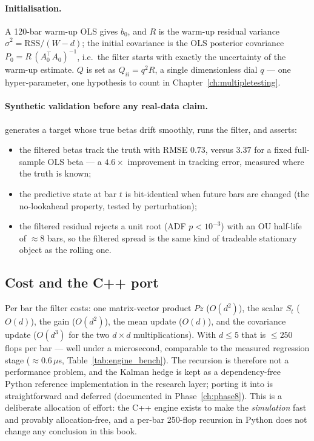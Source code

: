 \paragraph{Initialisation.} A 120-bar warm-up OLS gives $b_0$, and $R$ is the warm-up
residual variance $\hat\sigma^2=\mathrm{RSS}/(W-d)$; the initial covariance is the OLS
posterior covariance $P_0 = R\,(A_0^{\top}A_0)^{-1}$, i.e.\ the filter starts with
exactly the uncertainty of the warm-up estimate. $Q$ is set as $Q_{ii}=q^2R$, a single
dimensionless dial $q$ --- one hyper-parameter, one hypothesis to count in
Chapter~\ref{ch:multipletesting}.

\paragraph{Synthetic validation before any real-data claim.} 
generates a target whose true betas drift smoothly, runs the filter, and asserts:
\begin{itemize}
  \item the filtered betas track the truth with RMSE $0.73$, versus $3.37$ for a fixed
    full-sample OLS beta --- a $4.6\times$ improvement in tracking error, measured where
    the truth is known;
  \item the predictive state at bar $t$ is bit-identical when future bars are changed
    (the no-lookahead property, tested by perturbation);
  \item the filtered residual rejects a unit root (ADF $p<10^{-3}$) with an OU half-life
    of $\approx8$ bars, so the filtered spread is the same kind of tradeable stationary
    object as the rolling one.
\end{itemize}

\subsection{Cost and the C++ port}
\label{sec:kalman:cost}

Per bar the filter costs: one matrix-vector product $Pz$ ($O(d^2)$), the scalar $S_t$
($O(d)$), the gain ($O(d^2)$), the mean update ($O(d)$), and the covariance update
($O(d^3)$ for the two $d\times d$ multiplications). With $d\le5$ that is $\le 250$ flops
per bar --- well under a microsecond, comparable to the measured regression stage
($\approx0.6\,\mu$s, Table~\ref{tab:engine_bench}). The recursion is therefore not a
performance problem, and the Kalman hedge is kept as a dependency-free Python reference
implementation in the research layer; porting it into  is straightforward
and deferred (documented in Phase~\ref{ch:phase8}). This is a deliberate allocation of
effort: the C++ engine exists to make the \emph{simulation} fast and provably
allocation-free, and a per-bar 250-flop recursion in Python does not change any
conclusion in this book.
